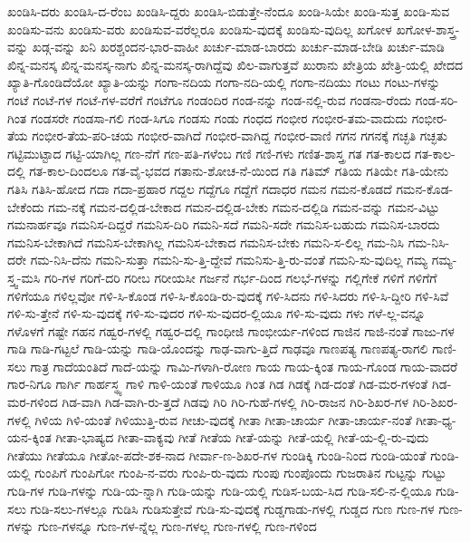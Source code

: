 {ಖಂಡಿಸಿ-ದರು
ಖಂಡಿಸಿ-ದ-ರೆಂಬ
ಖಂಡಿಸಿ-ದ್ದರು
ಖಂಡಿಸಿ-ಬಿಡುತ್ತೇ-ನೆಂದೂ
ಖಂಡಿ-ಸಿಯೇ
ಖಂಡಿ-ಸುತ್ತ
ಖಂಡಿ-ಸುವ
ಖಂಡಿಸು-ವನು
ಖಂಡಿಸು-ವರು
ಖಂಡಿಸುವ-ವರೆಲ್ಲರೂ
ಖಂಡಿಸು-ವುದಕ್ಕೆ
ಖಂಡಿಸು-ವುದಿಲ್ಲ
ಖಗೋಳ
ಖಗೋಳ-ಶಾಸ್ತ್ರ-ವನ್ನು
ಖಡ್ಗ-ವನ್ನು
ಖನಿ
ಖರಶ್ಚಂದನ-ಭಾರ-ವಾಹೀ
ಖರ್ಚು-ಮಾಡ-ಬಾರದು
ಖರ್ಚು-ಮಾಡ-ಬೇಡಿ
ಖರ್ಚು-ಮಾಡಿ
ಖಿನ್ನ-ಮನಸ್ಕ
ಖಿನ್ನ-ಮನಸ್ಕ-ನಾಗು
ಖಿನ್ನ-ಮನಸ್ಕ-ರಾಗಿದ್ದೆವು
ಖಿಲ-ವಾಗುತ್ತವೆ
ಖುರಾನು
ಖೇತ್ರಿಯ
ಖೇತ್ರಿ-ಯಲ್ಲಿ
ಖೇದದ
ಖ್ಯಾತಿ-ಗೊಂಡಿದೆಯೋ
ಖ್ಯಾತಿ-ಯನ್ನು
ಗಂಗಾ-ನದಿಯ
ಗಂಗಾ-ನದಿ-ಯಲ್ಲಿ
ಗಂಗಾ-ನದಿಯು
ಗಂಟು
ಗಂಟು-ಗಳನ್ನು
ಗಂಟೆ
ಗಂಟೆ-ಗಳ
ಗಂಟೆ-ಗಳ-ವರೆಗೆ
ಗಂಟೆಗೂ
ಗಂಡಂದಿರ
ಗಂಡ-ನನ್ನು
ಗಂಡ-ನಲ್ಲಿ-ರುವ
ಗಂಡನಾ-ರೆಂದು
ಗಂಡ-ಸರಿ-ಗಿಂತ
ಗಂಡಸರೇ
ಗಂಡಸಾ-ಗಲಿ
ಗಂಡ-ಸಿಗೂ
ಗಂಡಸು
ಗಂಡು
ಗಂಧದ
ಗಂಭೀರ
ಗಂಭೀರ-ತಮ-ವಾದುದು
ಗಂಭೀರ-ತೆಯ
ಗಂಭೀರ-ತೆಯ-ಪರಿ-ಚಯ
ಗಂಭೀರ-ವಾಗಿದೆ
ಗಂಭೀರ-ವಾಗಿದ್ದ
ಗಂಭೀರ-ವಾಣಿ
ಗಗನ
ಗಗನಕ್ಕೆ
ಗಚ್ಛತಿ
ಗಚ್ಛತು
ಗಟ್ಟಿಮುಟ್ಟಾದ
ಗಟ್ಟಿ-ಯಾಗಿಲ್ಲ
ಗಣ-ನೆಗೆ
ಗಣ-ಪತಿ-ಗಳೆಂಬ
ಗಣಿ
ಗಣಿ-ಗಳು
ಗಣಿತ-ಶಾಸ್ತ್ರ
ಗತ
ಗತ-ಕಾಲದ
ಗತ-ಕಾಲ-ದಲ್ಲಿ
ಗತ-ಕಾಲ-ದಿಂದಲೂ
ಗತ-ವೈ-ಭವದ
ಗತಾನು-ಶೋಚ-ನೆ-ಯಿಂದ
ಗತಿ
ಗತಿಮ್
ಗತಿಯ
ಗತಿಯೇ
ಗತಿ-ಯೇನು
ಗತಿಸಿ
ಗತಿಸಿ-ಹೋದ
ಗದಾ
ಗದಾ-ಪ್ರಹಾರ
ಗದ್ದಲ
ಗದ್ದೆಗೂ
ಗದ್ದೆಗೆ
ಗದಾಧರ
ಗಮನ
ಗಮನ-ಕೊಡದೆ
ಗಮನ-ಕೊಡ-ಬೇಕೆಂದು
ಗಮ-ನಕ್ಕೆ
ಗಮನ-ದಲ್ಲಿಡ-ಬೇಕಾದ
ಗಮನ-ದಲ್ಲಿಡ-ಬೇಕು
ಗಮನ-ದಲ್ಲಿಡಿ
ಗಮನ-ವನ್ನು
ಗಮನ-ವಿಟ್ಟು
ಗಮನಾರ್ಹವೂ
ಗಮನಿಸ-ದಿದ್ದರೆ
ಗಮನಿಸ-ದಿರಿ
ಗಮನಿ-ಸದೆ
ಗಮನಿ-ಸದೇ
ಗಮನಿಸ-ಬಹುದು
ಗಮನಿಸ-ಬಾರದು
ಗಮನಿಸ-ಬೇಕಾಗಿದೆ
ಗಮನಿಸ-ಬೇಕಾಗಿಲ್ಲ
ಗಮನಿಸ-ಬೇಕಾದ
ಗಮನಿಸ-ಬೇಕು
ಗಮನಿ-ಸ-ಲಿಲ್ಲ
ಗಮ-ನಿಸಿ
ಗಮ-ನಿಸಿ-ದರೇ
ಗಮ-ನಿಸಿ-ದೆನು
ಗಮನಿ-ಸುತ್ತಾ
ಗಮನಿ-ಸು-ತ್ತಿ-ದ್ದೇವೆ
ಗಮನಿಸು-ತ್ತಿ-ರು-ವಂತೆ
ಗಮನಿ-ಸು-ವುದಿಲ್ಲ
ಗಮ್ಯ
ಗಮ್ಯ-ಸ್ತ್ವ-ಮಸಿ
ಗರಿ-ಗಳ
ಗರಿಗೆ-ದರಿ
ಗರೀಬ
ಗರೀಯಸೀ
ಗರ್ಜನೆ
ಗರ್ಭ-ದಿಂದ
ಗಲಭೆ-ಗಳನ್ನು
ಗಲ್ಲಿಗೇಕೆ
ಗಳಿಗೆ
ಗಳಿಗೆಗೆ
ಗಳಿಗೆಯೂ
ಗಳಿಲ್ಲವೋ
ಗಳಿ-ಸಿ-ಕೊಂಡ
ಗಳಿ-ಸಿ-ಕೊಂಡಿ-ರು-ವುದಕ್ಕೆ
ಗಳಿ-ಸಿದನು
ಗಳಿ-ಸಿದರು
ಗಳಿ-ಸಿ-ದ್ದೀರಿ
ಗಳಿ-ಸಿವೆ
ಗಳಿ-ಸು-ತ್ತೇನೆ
ಗಳಿ-ಸು-ವುದಕ್ಕೆ
ಗಳಿ-ಸು-ವುದರ
ಗಳಿ-ಸು-ವುದರ-ಲ್ಲಿಯೂ
ಗಳಿ-ಸು-ವುದು
ಗಳು
ಗಳೆ-ಲ್ಲ-ವನ್ನೂ
ಗಳೊಳಗೆ
ಗಷ್ಟೇ
ಗಹನ
ಗಹ್ವರ-ಗಳಲ್ಲಿ
ಗಹ್ವರ-ದಲ್ಲಿ
ಗಾಂಧೀಜಿ
ಗಾಂಭೀರ್ಯ-ಗಳಿಂದ
ಗಾಜಿನ
ಗಾಜಿ-ನಂತೆ
ಗಾಜು-ಗಳ
ಗಾಡಿ
ಗಾಡಿ-ಗಟ್ಟಲೆ
ಗಾಡಿ-ಯನ್ನು
ಗಾಡಿ-ಯೊಂದನ್ನು
ಗಾಢ-ವಾಗು-ತ್ತಿದೆ
ಗಾಢವೂ
ಗಾಣಪತ್ಯ
ಗಾಣಪತ್ಯ-ರಾಗಲಿ
ಗಾಣಿ-ಸಲು
ಗಾತ್ರ
ಗಾದೆಯಂತಿದೆ
ಗಾದೆ-ಯನ್ನು
ಗಾಮಿ-ಗಳಾಗಿ-ರೋಣ
ಗಾಯ
ಗಾಯ-ಕ್ಕಿಂತ
ಗಾಯ-ಗೊಂಡ
ಗಾಯ-ವಾದರೆ
ಗಾರ-ನಿಗೂ
ಗಾರ್ಗಿ
ಗಾರ್ಹಸ್ಥ್ಯ
ಗಾಳಿ
ಗಾಳಿ-ಯಂತೆ
ಗಾಳಿಯೂ
ಗಿಂತ
ಗಿಡ
ಗಿಡಕ್ಕೆ
ಗಿಡ-ದಂತೆ
ಗಿಡ-ಮರ-ಗಳಂತೆ
ಗಿಡ-ಮರ-ಗಳಿಂದ
ಗಿಡ-ವಾಗಿ
ಗಿಡ-ವಾಗಿ-ರು-ತ್ತದೆ
ಗಿಡವು
ಗಿರಿ
ಗಿರಿ-ಗುಹೆ-ಗಳಲ್ಲಿ
ಗಿರಿ-ರಾಜನ
ಗಿರಿ-ಶಿಖರ-ಗಳ
ಗಿರಿ-ಶಿಖರ-ಗಳಲ್ಲಿ
ಗಿಳಿಯ
ಗಿಳಿ-ಯಂತೆ
ಗಿಳಿಯುತ್ತಿ-ರುವ
ಗೀಚು-ವುದಕ್ಕೆ
ಗೀತಾ
ಗೀತಾ-ಚಾರ್ಯ
ಗೀತಾ-ಚಾರ್ಯ-ನಂತೆ
ಗೀತಾ-ಧ್ಯ-ಯನ-ಕ್ಕಿಂತ
ಗೀತಾ-ಭಾಷ್ಯದ
ಗೀತಾ-ವಾಕ್ಯವು
ಗೀತೆ
ಗೀತೆಯ
ಗೀತೆ-ಯನ್ನು
ಗೀತೆ-ಯಲ್ಲಿ
ಗೀತೆ-ಯ-ಲ್ಲಿ-ರು-ವುದು
ಗೀತೆಯು
ಗೀತೆಯೂ
ಗೀತೋ-ಪದೇ-ಶಕ-ನಾದ
ಗೀರ್ವಾ-ಣ-ಶಿಖರ-ಗಳ
ಗುಂಡಿಕ್ಕಿ
ಗುಂಡಿ-ನಿಂದ
ಗುಂಡಿ-ಯಂತೆ
ಗುಂಡಿ-ಯಲ್ಲಿ
ಗುಂಪಿಗೆ
ಗುಂಪಿಗೋ
ಗುಂಪಿ-ನ-ವರು
ಗುಂಪಿ-ರು-ವುದು
ಗುಂಪು
ಗುಂಪೊಂದು
ಗುಜರಾತಿನ
ಗುಟ್ಟನ್ನು
ಗುಟ್ಟು
ಗುಡಿ-ಗಳ
ಗುಡಿ-ಗಳನ್ನು
ಗುಡಿ-ಯ-ನ್ನಾಗಿ
ಗುಡಿ-ಯನ್ನು
ಗುಡಿ-ಯಲ್ಲಿ
ಗುಡಿಸ-ಬಯ-ಸಿದ
ಗುಡಿ-ಸಲಿ-ನ-ಲ್ಲಿಯೂ
ಗುಡಿ-ಸಲು
ಗುಡಿ-ಸಲು-ಗಳಲ್ಲೂ
ಗುಡಿಸಿ
ಗುಡಿಸುತ್ತೇವೆ
ಗುಡಿ-ಸು-ವುದಕ್ಕೆ
ಗುಡ್ಡಗಾಡು-ಗಳಲ್ಲಿ
ಗುಡ್ಡದ
ಗುಣ
ಗುಣ-ಗಳ
ಗುಣ-ಗಳನ್ನು
ಗುಣ-ಗಳನ್ನೂ
ಗುಣ-ಗಳ-ನ್ನೆಲ್ಲ
ಗುಣ-ಗಳಲ್ಲ
ಗುಣ-ಗಳಲ್ಲಿ
ಗುಣ-ಗಳಿಂದ
}
